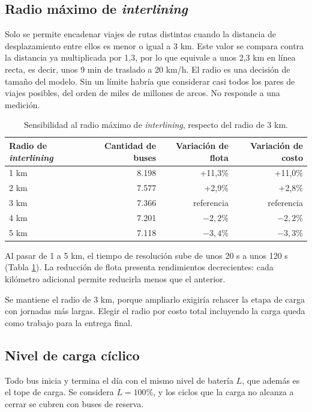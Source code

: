 \subsection{Radio máximo de \textit{interlining}}
\label{sup:radio}

Solo se permite encadenar viajes de rutas distintas cuando la distancia de desplazamiento entre ellos es menor o igual a 3 km. Este valor se compara contra la distancia ya multiplicada por 1,3, por lo que equivale a unos 2,3 km en línea recta, es decir, unos 9 min de traslado a 20 km/h.
El radio es una decisión de tamaño del modelo. Sin un límite habría que considerar casi todos los pares de viajes posibles, del orden de miles de millones de arcos. No responde a una medición.

\begin{table}[H]
\centering
\small
\begin{tabular}{lrrr}
\toprule
Radio de \textit{interlining} & Cantidad de buses & Variación de flota & Variación de costo \\
\midrule
1 km & 8.198 & +11,3\% & +11,0\% \\
2 km & 7.577 & +2,9\% & +2,8\% \\
3 km & 7.366 & referencia & referencia \\
4 km & 7.201 & $-2{,}2$\% & $-2{,}2$\% \\
5 km & 7.118 & $-3{,}4$\% & $-3{,}3$\% \\
\bottomrule
\end{tabular}
\caption{Sensibilidad al radio máximo de \textit{interlining}, respecto del radio de 3 km.}
\label{tab:radio}
\end{table}

Al pasar de 1 a 5 km, el tiempo de resolución sube de unos 20 s a unos 120 s (Tabla \ref{tab:radio}). La reducción de flota presenta rendimientos decrecientes: cada kilómetro adicional permite reducirla menos que el anterior.

Se mantiene el radio de 3 km, porque ampliarlo exigiría rehacer la etapa de carga con jornadas más largas. Elegir el radio por costo total incluyendo la carga queda como trabajo para la entrega final.

\subsection{Nivel de carga cíclico}
\label{sup:ciclo}

Todo bus inicia y termina el día con el mismo nivel de batería $L$, que además es el tope de carga. Se considera $L = 100$\%, y los ciclos que la carga no alcanza a cerrar se cubren con buses de reserva.

